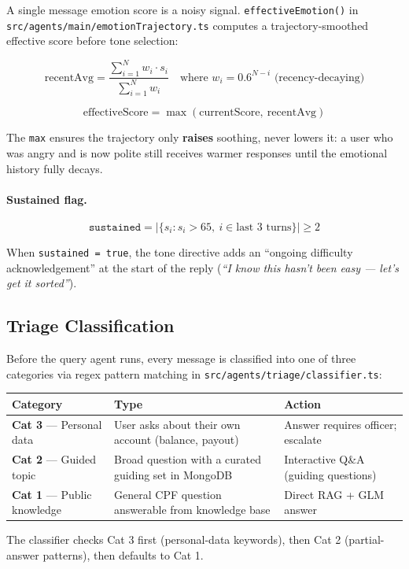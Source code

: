 \documentclass[12pt,a4paper]{article}
\begin{document}
A single message emotion score is a noisy signal. \texttt{effectiveEmotion()}
in \texttt{src/agents/main/emotionTrajectory.ts} computes a trajectory-smoothed
effective score before tone selection:

\[
\text{recentAvg} = \frac{\sum_{i=1}^{N} w_i \cdot s_i}{\sum_{i=1}^{N} w_i}
\quad \text{where } w_i = 0.6^{N-i} \text{ (recency-decaying)}
\]

\[
\text{effectiveScore} = \max(\text{currentScore},\ \text{recentAvg})
\]

The \texttt{max} ensures the trajectory only \textbf{raises} soothing, never lowers it:
a user who was angry and is now polite still receives warmer responses until the
emotional history fully decays.

\paragraph{Sustained flag.}
\[
\texttt{sustained} = \left|\{s_i : s_i > 65,\ i \in \text{last 3 turns}\}\right| \geq 2
\]

When \texttt{sustained = true}, the tone directive adds an
``ongoing difficulty acknowledgement'' at the start of the reply
(\textit{``I know this hasn't been easy — let's get it sorted''}).

\subsection{Triage Classification}

Before the query agent runs, every message is classified into one of three
categories via regex pattern matching in \texttt{src/agents/triage/classifier.ts}:

\begin{tabular}{@{}lll@{}}
\toprule
\textbf{Category} & \textbf{Type} & \textbf{Action} \\
\midrule
\textbf{Cat 3} — Personal data   & User asks about their own account (balance, payout) & Answer requires officer; escalate \\
\textbf{Cat 2} — Guided topic    & Broad question with a curated guiding set in MongoDB & Interactive Q\&A (guiding questions) \\
\textbf{Cat 1} — Public knowledge & General CPF question answerable from knowledge base & Direct RAG + GLM answer \\
\bottomrule
\end{tabular}

The classifier checks Cat 3 first (personal-data keywords), then Cat 2
(partial-answer patterns), then defaults to Cat 1.
\end{document}
